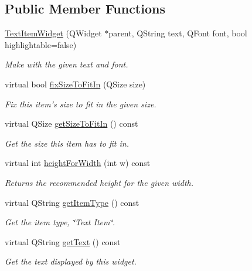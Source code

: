 \subsection*{Public Member Functions}
\begin{DoxyCompactItemize}
\item 
\hyperlink{class_u_i_1_1_text_item_widget_abb6aa87b77090161bb82431fdc3bc3d7}{Text\-Item\-Widget} (Q\-Widget $\ast$parent, Q\-String text, Q\-Font font, bool highlightable=false)
\begin{DoxyCompactList}\small\item\em Make with the given text and font. \end{DoxyCompactList}\item 
virtual bool \hyperlink{class_u_i_1_1_text_item_widget_a47a251b493d1a372bbb772c99fa8d5f2}{fix\-Size\-To\-Fit\-In} (Q\-Size size)
\begin{DoxyCompactList}\small\item\em Fix this item's size to fit in the given size. \end{DoxyCompactList}\item 
virtual Q\-Size \hyperlink{class_u_i_1_1_text_item_widget_a4b9d1546ff00c618dbc33c5c2816ec25}{get\-Size\-To\-Fit\-In} () const 
\begin{DoxyCompactList}\small\item\em Get the size this item has to fit in. \end{DoxyCompactList}\item 
virtual int \hyperlink{class_u_i_1_1_text_item_widget_ac8942f90fca4db96d61c2c5ecd436f4f}{height\-For\-Width} (int w) const 
\begin{DoxyCompactList}\small\item\em Returns the recommended height for the given width. \end{DoxyCompactList}\item 
virtual Q\-String \hyperlink{class_u_i_1_1_text_item_widget_ab0c54430b127f59f1235585e59a05d76}{get\-Item\-Type} () const 
\begin{DoxyCompactList}\small\item\em Get the item type, \char`\"{}\-Text Item\char`\"{}. \end{DoxyCompactList}\item 
virtual Q\-String \hyperlink{class_u_i_1_1_text_item_widget_a704f08149116e02bcb27a17507a031f1}{get\-Text} () const 
\begin{DoxyCompactList}\small\item\em Get the text displayed by this widget. \end{DoxyCompactList}\item 

\end{DoxyCompactItemize}
